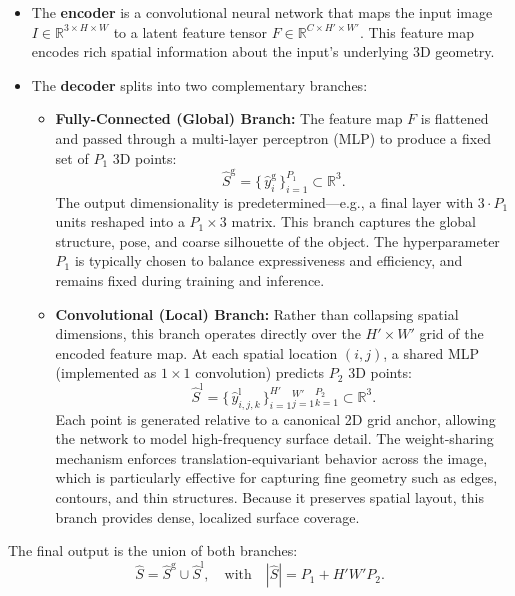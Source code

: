 \begin{itemize}
    \item The \textbf{encoder} is a convolutional neural network that maps the input image \( I \in \mathbb{R}^{3 \times H \times W} \) to a latent feature tensor \( F \in \mathbb{R}^{C \times H' \times W'} \). This feature map encodes rich spatial information about the input's underlying 3D geometry.
    
    \item The \textbf{decoder} splits into two complementary branches:
    \begin{itemize}
        \item \textbf{Fully-Connected (Global) Branch:} The feature map \(F\) is flattened and passed through a multi-layer perceptron (MLP) to produce a fixed set of \(P_1\) 3D points:
        \[
        \hat{S}^{\mathrm{g}} = \{\,\hat{y}_i^{\mathrm{g}}\,\}_{i=1}^{P_1} \subset \mathbb{R}^3.
        \]
        The output dimensionality is predetermined—e.g., a final layer with \(3 \cdot P_1\) units reshaped into a \(P_1 \times 3\) matrix. This branch captures the global structure, pose, and coarse silhouette of the object. The hyperparameter \(P_1\) is typically chosen to balance expressiveness and efficiency, and remains fixed during training and inference.
        
        \newpage
        \item \textbf{Convolutional (Local) Branch:} Rather than collapsing spatial dimensions, this branch operates directly over the \(H' \times W'\) grid of the encoded feature map. At each spatial location \((i, j)\), a shared MLP (implemented as \(1 \times 1\) convolution) predicts \(P_2\) 3D points:
        \[
        \hat{S}^{\mathrm{l}} = \{\,\hat{y}_{i,j,k}^{\mathrm{l}}\,\}_{i=1}^{H'}{}_{j=1}^{W'}{}_{k=1}^{P_2} \subset \mathbb{R}^3.
        \]
        Each point is generated relative to a canonical 2D grid anchor, allowing the network to model high-frequency surface detail. The weight-sharing mechanism enforces translation-equivariant behavior across the image, which is particularly effective for capturing fine geometry such as edges, contours, and thin structures. Because it preserves spatial layout, this branch provides dense, localized surface coverage.
    \end{itemize}
\end{itemize}

The final output is the union of both branches:
\[
\hat{S} = \hat{S}^{\mathrm{g}} \cup \hat{S}^{\mathrm{l}}, \quad \text{with} \quad |\hat{S}| = P_1 + H'W'P_2.
\]

